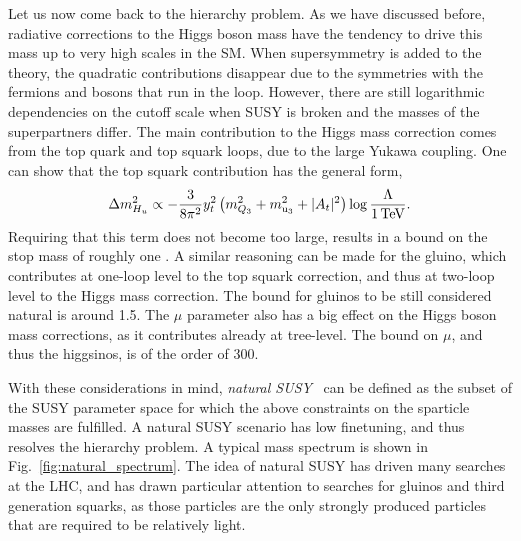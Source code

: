 Let us now come back to the hierarchy problem. As we have discussed before, radiative corrections
to the Higgs boson mass have the tendency to drive this mass up to very high scales in the SM. When
 supersymmetry is added to the theory, the quadratic contributions disappear due to the symmetries
with the fermions and bosons that run in the loop. However, there are still logarithmic dependencies
on the cutoff scale when SUSY is broken and the masses of the superpartners differ. 
The main contribution to the Higgs mass correction comes from the top quark and top squark loops,
due to the large Yukawa coupling. One can show that the top squark contribution has the general
form,
\begin{equation}
  \Delta m_{H_u}^2 \propto - \frac{3}{8\pi^2} y^2_t \left( m^2_{Q_3} + m^2_{\mathrm{u}_3} + |A_t|^2 
  \right) \log \frac{\Lambda}{1\,\text{Te\hspace{-.08em}V}} .
\end{equation}
Requiring that this term does not become too large, results in a bound on the stop mass of roughly
one \TeV. A similar reasoning can be made for the gluino, which contributes at one-loop level to the
top squark correction, and thus at two-loop level to the Higgs mass correction. The bound for
gluinos to be still considered natural is around 1.5\TeV. 
The $\mu$ parameter also has a big effect on the Higgs boson mass corrections, as it contributes
already at tree-level. The bound on $\mu$, and thus the higgsinos, is of the order of 300\GeV. 

With these considerations in mind, \textit{natural SUSY}~\cite{Barbieri:2009ev,Papucci:2011wy} can
be defined as the subset of the SUSY parameter space for which the above constraints on the
sparticle masses are fulfilled. 
A natural SUSY scenario has low finetuning, and thus resolves the hierarchy problem. A typical mass
spectrum is shown in Fig.~\ref{fig:natural_spectrum}. The idea of natural SUSY has driven many
searches at the LHC, and has drawn particular attention to searches for gluinos and third
generation squarks, as those particles are the only strongly produced particles that are required
to be relatively light. 


